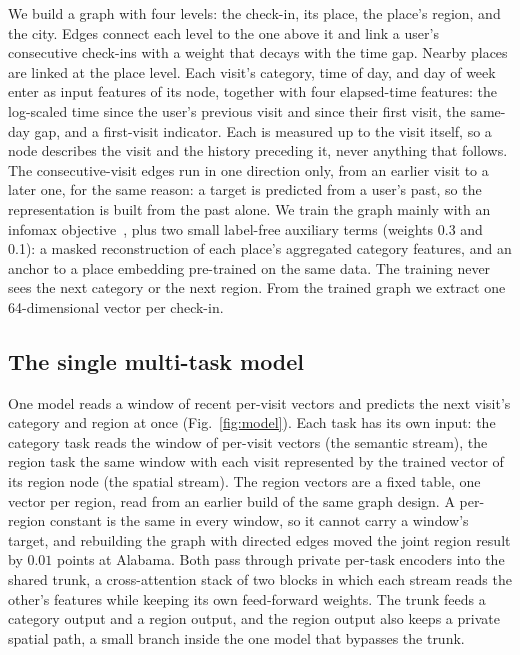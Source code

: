 We build a graph with four levels: the check-in, its place, the place's region, and the city. Edges connect each level to the one above it and link a user's consecutive check-ins with a weight that decays with the time gap. Nearby places are linked at the place level. Each visit's category, time of day, and day of week enter as input features of its node, together with four elapsed-time features: the log-scaled time since the user's previous visit and since their first visit, the same-day gap, and a first-visit indicator. Each is measured up to the visit itself, so a node describes the visit and the history preceding it, never anything that follows. The consecutive-visit edges run in one direction only, from an earlier visit to a later one, for the same reason: a target is predicted from a user's past, so the representation is built from the past alone. We train the graph mainly with an infomax objective~\cite{velickovic2019dgi,huang2023hgi}, plus two small label-free auxiliary terms (weights 0.3 and 0.1): a masked reconstruction of each place's aggregated category features, and an anchor to a place embedding pre-trained on the same data. The training never sees the next category or the next region. From the trained graph we extract one 64-dimensional vector per check-in.

\subsection{The single multi-task model}
\label{sec:method-model}

One model reads a window of recent per-visit vectors and predicts the next visit's category and region at once (Fig.~\ref{fig:model}). Each task has its own input: the category task reads the window of per-visit vectors (the semantic stream), the region task the same window with each visit represented by the trained vector of its region node (the spatial stream). The region vectors are a fixed table, one vector per region, read from an earlier build of the same graph design. A per-region constant is the same in every window, so it cannot carry a window's target, and rebuilding the graph with directed edges moved the joint region result by $0.01$ points at Alabama. Both pass through private per-task encoders into the shared trunk, a cross-attention stack of two blocks in which each stream reads the other's features while keeping its own feed-forward weights. The trunk feeds a category output and a region output, and the region output also keeps a private spatial path, a small branch inside the one model that bypasses the trunk.

